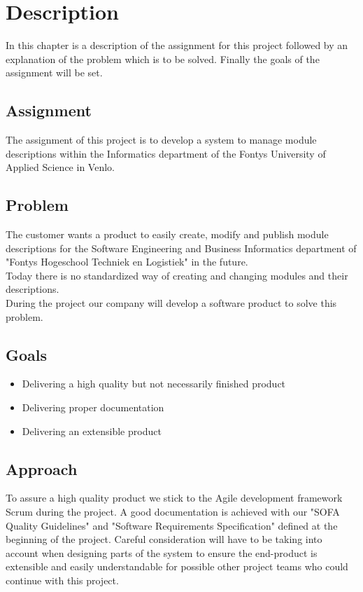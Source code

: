 \chapter{Description}
In this chapter is a description of the assignment for this project followed by an explanation 
of the problem which is to be solved. Finally the goals of the assignment will be set.

\section{Assignment}
The assignment of this project is to develop a system to manage module descriptions within the Informatics
department of the Fontys University of Applied Science in Venlo. 

\section{Problem}
The customer wants a product to easily create, modify and publish module descriptions
for the Software Engineering and Business Informatics department of "Fontys Hogeschool Techniek en Logistiek" in the future.
\newline \\
Today there is no standardized way of creating and changing modules and their descriptions.
\newline \\
During the project our company will develop a software product to solve this problem.

\newpage

\section{Goals}
\begin{itemize}
    \item Delivering a high quality but not necessarily finished product 
    \item Delivering proper documentation
    \item Delivering an extensible product
\end{itemize}

\section{Approach}
To assure a high quality product we stick to the Agile development framework Scrum during the project.
A good documentation is achieved with our "SOFA Quality Guidelines" and "Software Requirements Specification" defined at the beginning of the project.
Careful consideration will have to be taking into account when designing parts of the system to ensure the end-product is extensible and easily understandable for possible other project teams who could continue with this project.


